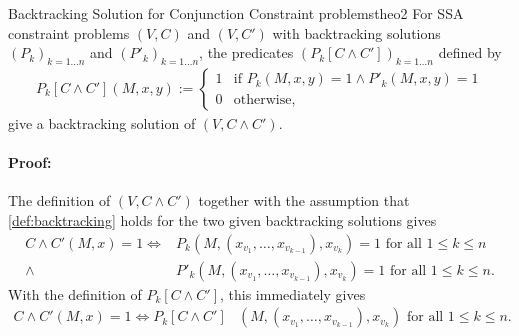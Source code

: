\begin{theorem}{Backtracking Solution for Conjunction Constraint problems}{theo2}
    For SSA constraint problems $(V,C)$ and $(V,C')$ with backtracking
    solutions $(P_k)_{k=1\dots n}$ and $(P'_k)_{k=1\dots n}$, the
    predicates $(P_k[C\mathrel\land C'])_{k=1\dots n}$ defined by
    \begin{align*}
        P_k[C\mathrel\land C'](M,x,y):=\left\{
            \begin{array}{ll}
                1&\text{if }P_k(M,x,y)=1\mathrel\land P'_k(M,x,y)=1\\[-0.15em]
                0&\text{otherwise},
            \end{array}\right.
    \end{align*}
    give a backtracking solution of $(V,C\mathrel\land C')$.
    \tcblower
    \paragraph*{Proof:}
    The definition of $(V,C\mathrel\land C')$ together with the
    assumption that \autoref{def:backtracking} holds for the two given
    backtracking solutions gives
    \begin{align*}
        C\mathrel\land C'(M,x)=1\iff{}& P_k(M,(x_{v_1},\dots,x_{v_{k-1}}),x_{v_k})=1\text{ for all }1\leq k\leq n\\[-0.15em]
                              \mathrel\land{}& P'_k(M,(x_{v_1},\dots,x_{v_{k-1}}),x_{v_k})=1\text{ for all }1\leq k\leq n.
    \end{align*}
    With the definition of $P_k[C\mathrel\land C']$, this immediately gives
    \begin{align*}
        C\mathrel\land C'(M,x)=1\iff P_k[C\mathrel\land C']&(M,(x_{v_1},\dots,x_{v_{k-1}}),x_{v_k})\text{ for all }1\leq k\leq n.
    \end{align*}
\end{theorem}
